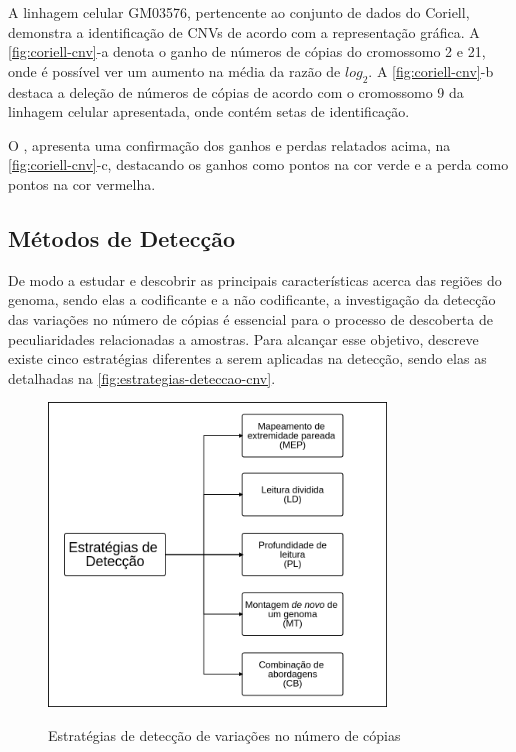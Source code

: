 A linhagem celular GM03576, pertencente ao conjunto de dados do Coriell, demonstra a identificação de CNVs de acordo com a representação gráfica. A \autoref{fig:coriell-cnv}-a denota o ganho de números de cópias do cromossomo 2 e 21, onde é possível ver um aumento na média da razão de $log_{2}$. A \autoref{fig:coriell-cnv}-b destaca a deleção de números de cópias de acordo com o cromossomo 9 da linhagem celular apresentada, onde contém setas de identificação.

O \cite{Snijders2001}, apresenta uma confirmação dos ganhos e perdas relatados acima, na \autoref{fig:coriell-cnv}-c, destacando os ganhos como pontos na cor verde e a perda como pontos na cor vermelha.

\subsection{Métodos de Detecção} 

De modo a estudar e descobrir as principais características acerca das regiões do genoma, sendo elas a codificante e a não codificante, a investigação da detecção das variações no número de cópias é essencial para o processo de descoberta de peculiaridades relacionadas a amostras. Para alcançar esse objetivo, \cite{Zhao2013} descreve existe cinco estratégias diferentes a serem aplicadas na detecção, sendo elas as detalhadas na \autoref{fig:estrategias-deteccao-cnv}.

\begin{figure}[!htb]
    \centering
    \caption{Estratégias de detecção de variações no número de cópias}
    \includegraphics[width=0.8\textwidth]{./dados/figuras/estrategias-deteccao-cnv}
    \label{fig:estrategias-deteccao-cnv}
\end{figure}

